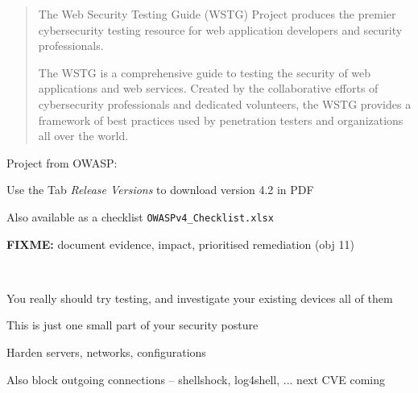 \documentclass[Screen16to9,17pt]{foils}
\begin{document}




\begin{quote}
The Web Security Testing Guide (WSTG) Project produces the premier cybersecurity
testing resource for web application developers and security professionals.

The WSTG is a comprehensive guide to testing the security of web applications and
web services. Created by the collaborative efforts of cybersecurity professionals
and dedicated volunteers, the WSTG provides a framework of best practices used by
penetration testers and organizations all over the world.
\end{quote}

\begin{list2}
\item Project from OWASP:\\
\item Use the Tab \emph{Release Versions} to download version 4.2 in PDF
\item Also available as a checklist \verb+OWASPv4_Checklist.xlsx+
\end{list2}

\begin{list2}
\item \textbf{FIXME:} document evidence, impact, prioritised remediation (obj 11)
\end{list2}



~
\begin{list2}
\item You really should try testing, and investigate your existing devices
all of them
\item This is just one small part of your security posture
\item Harden servers, networks, configurations
\item Also block outgoing connections -- shellshock, log4shell, ... next CVE coming

\end{list2}

\myquestionspage
\end{document}
